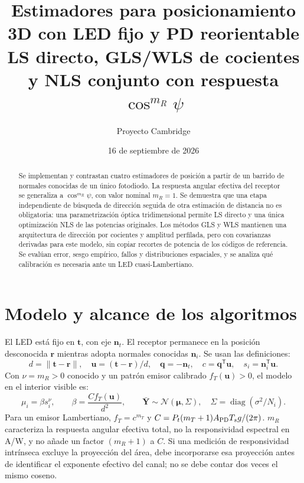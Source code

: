 \documentclass[11pt,a4paper]{article}
\title{Estimadores para posicionamiento 3D con LED fijo y PD reorientable\\\large LS directo, GLS/WLS de cocientes y NLS conjunto con respuesta $\cos^{m_R}\psi$}
\author{Proyecto Cambridge}
\date{16 de septiembre de 2026}
\begin{document}
\maketitle
\begin{abstract}
Se implementan y contrastan cuatro estimadores de posición a partir de un barrido de normales conocidas de un único fotodiodo. La respuesta angular efectiva del receptor se generaliza a $\cos^{m_R}\psi$, con valor nominal $m_R=1$. Se demuestra que una etapa independiente de búsqueda de dirección seguida de otra estimación de distancia no es obligatoria: una parametrización óptica tridimensional permite LS directo y una única optimización NLS de las potencias originales. Los métodos GLS y WLS mantienen una arquitectura de dirección por cocientes y amplitud perfilada, pero con covarianzas derivadas para este modelo, sin copiar recortes de potencia de los códigos de referencia. Se evalúan error, sesgo empírico, fallos y distribuciones espaciales, y se analiza qué calibración es necesaria ante un LED cuasi-Lambertiano.
\end{abstract}
\tableofcontents
\clearpage

\section{Modelo y alcance de los algoritmos}
El LED está fijo en $\mathbf t$, con eje $\mathbf n_t$. El receptor permanece en la posición desconocida $\mathbf r$ mientras adopta normales conocidas $\mathbf n_i$. Se usan las definiciones:
\begin{equation}
 d=\|\mathbf t-\mathbf r\|,\quad \mathbf u=(\mathbf t-\mathbf r)/d,\quad
 \mathbf q=-\mathbf n_t,\quad c=\mathbf q^{\mathsf T}\mathbf u,\quad s_i=\mathbf n_i^{\mathsf T}\mathbf u.
\end{equation}
Con $\nu=m_R>0$ conocido y un patrón emisor calibrado $f_T(\mathbf u)>0$, el modelo en el interior visible es:
\begin{equation}
 \mu_i=\beta s_i^\nu,\qquad \beta=\frac{Cf_T(\mathbf u)}{d^2},\qquad
 \bar{\mathbf Y}\sim\mathcal N(\bm\mu,\Sigma),\quad \Sigma=\operatorname{diag}(\sigma^2/N_i).
\label{eq:model}
\end{equation}
Para un emisor Lambertiano, $f_T=c^{m_T}$ y $C=P_t(m_T+1)A_{\rm PD}T_sg/(2\pi)$. $m_R$ caracteriza la respuesta angular efectiva total, no la responsividad espectral en A/W, y no añade un factor $(m_R+1)$ a $C$. Si una medición de responsividad intrínseca excluye la proyección del área, debe incorporarse esa proyección antes de identificar el exponente efectivo del canal; no se debe contar dos veces el mismo coseno.
\end{document}
